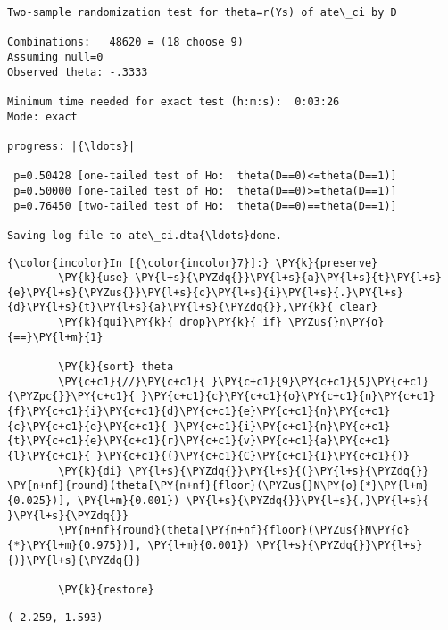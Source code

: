\documentclass[11pt,notitlepage]{article}\usepackage[]{graphicx}\usepackage[]{color}
\makeatletter
\newenvironment{kframe}{%
 \def\at@end@of@kframe{}%
 \ifinner\ifhmode%
  \def\at@end@of@kframe{\end{minipage}}%
  \begin{minipage}{\columnwidth}%
 \fi\fi%
 \def\FrameCommand##1{\hskip\@totalleftmargin \hskip-\fboxsep
 \colorbox{shadecolor}{##1}\hskip-\fboxsep
     \hskip-\linewidth \hskip-\@totalleftmargin \hskip\columnwidth}%
 \MakeFramed {\advance\hsize-\width
   \@totalleftmargin\z@ \linewidth\hsize
   \@setminipage}}%
 {\par\unskip\endMakeFramed%
 \at@end@of@kframe}
\newenvironment{knitrout}{}{} %
\makeatother
\begin{document}
\begin{enumerate}[a)]
\begin{knitrout}
\begin{kframe}
    \begin{Verbatim}[commandchars=\\\{\}]
Two-sample randomization test for theta=r(Ys) of ate\_ci by D

Combinations:   48620 = (18 choose 9)
Assuming null=0
Observed theta: -.3333

Minimum time needed for exact test (h:m:s):  0:03:26
Mode: exact

progress: |{\ldots}|

 p=0.50428 [one-tailed test of Ho:  theta(D==0)<=theta(D==1)]
 p=0.50000 [one-tailed test of Ho:  theta(D==0)>=theta(D==1)]
 p=0.76450 [two-tailed test of Ho:  theta(D==0)==theta(D==1)]

Saving log file to ate\_ci.dta{\ldots}done.

    \end{Verbatim}

    \begin{Verbatim}[commandchars=\\\{\}]
{\color{incolor}In [{\color{incolor}7}]:} \PY{k}{preserve}
        \PY{k}{use} \PY{l+s}{\PYZdq{}}\PY{l+s}{a}\PY{l+s}{t}\PY{l+s}{e}\PY{l+s}{\PYZus{}}\PY{l+s}{c}\PY{l+s}{i}\PY{l+s}{.}\PY{l+s}{d}\PY{l+s}{t}\PY{l+s}{a}\PY{l+s}{\PYZdq{}},\PY{k}{ clear}
        \PY{k}{qui}\PY{k}{ drop}\PY{k}{ if} \PYZus{}n\PY{o}{==}\PY{l+m}{1}
        
        \PY{k}{sort} theta
        \PY{c+c1}{//}\PY{c+c1}{ }\PY{c+c1}{9}\PY{c+c1}{5}\PY{c+c1}{\PYZpc{}}\PY{c+c1}{ }\PY{c+c1}{c}\PY{c+c1}{o}\PY{c+c1}{n}\PY{c+c1}{f}\PY{c+c1}{i}\PY{c+c1}{d}\PY{c+c1}{e}\PY{c+c1}{n}\PY{c+c1}{c}\PY{c+c1}{e}\PY{c+c1}{ }\PY{c+c1}{i}\PY{c+c1}{n}\PY{c+c1}{t}\PY{c+c1}{e}\PY{c+c1}{r}\PY{c+c1}{v}\PY{c+c1}{a}\PY{c+c1}{l}\PY{c+c1}{ }\PY{c+c1}{(}\PY{c+c1}{C}\PY{c+c1}{I}\PY{c+c1}{)}
        \PY{k}{di} \PY{l+s}{\PYZdq{}}\PY{l+s}{(}\PY{l+s}{\PYZdq{}} \PY{n+nf}{round}(theta[\PY{n+nf}{floor}(\PYZus{}N\PY{o}{*}\PY{l+m}{0.025})], \PY{l+m}{0.001}) \PY{l+s}{\PYZdq{}}\PY{l+s}{,}\PY{l+s}{ }\PY{l+s}{\PYZdq{}}
        \PY{n+nf}{round}(theta[\PY{n+nf}{floor}(\PYZus{}N\PY{o}{*}\PY{l+m}{0.975})], \PY{l+m}{0.001}) \PY{l+s}{\PYZdq{}}\PY{l+s}{)}\PY{l+s}{\PYZdq{}}
        
        \PY{k}{restore}
\end{Verbatim}

    \begin{Verbatim}[commandchars=\\\{\}]
(-2.259, 1.593)
    \end{Verbatim}

\end{kframe}
\end{knitrout}


\end{enumerate}
\end{document}
